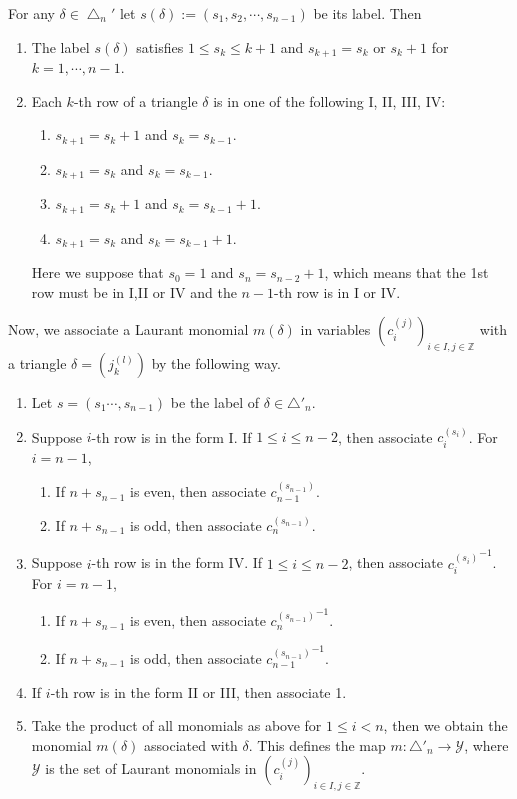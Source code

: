 \begin{lem}\label{s4-d}
For any ${\delta}\in{\bigtriangleup}_n'$ 
let $s({\delta}):=(s_1,s_2,{\cdots},s_{n-1})$ be its label.
Then 
\begin{enumerate}
\item
The label $s({\delta})$  satisfies 
$1\leq s_k\leq k+1$ and $s_{k+1}=s_k$ or $s_k+1$ for $k=1,{\cdots},n-1$.
\item
Each  $k$-th row of a triangle ${\delta}$ is in 
one of the following
     {\rm I, II, III, IV:}
\begin{enumerate}[\rm I.]
\item $s_{k+1}=s_k+1$ and $s_k=s_{k-1}$.
\item $s_{k+1}=s_k$ and $s_k=s_{k-1}$.
\item $s_{k+1}=s_k+1$ and $s_k=s_{k-1}+1$.
\item $s_{k+1}=s_k$ and $s_k=s_{k-1}+1$.
\end{enumerate}
Here we suppose that $s_0=1$ and $s_{n}=s_{n-2}+1$, which means that 
the 1st row must be in {\rm I,II or IV} 
and the $n-1$-th row is in {\rm I or IV}.
\end{enumerate}
\end{lem}
Now, we associate a Laurant 
monomial $m({\delta})$ in variables $({c_{i}^{(j)}})_{i\in I,j\in{\mathbb Z}}$ 
with a triangle ${\delta}=({j_{k}^{(l)}})$ by the
following way.
\begin{enumerate}
\item Let $s=(s_1{\cdots},s_{n-1})$  be the label of ${\delta}\in{\bigtriangleup}'_n$.
\item Suppose  $i$-th row is in the form I. If $1\leq i\leq n-2$, 
 then associate ${c_{i}^{(s_i)}}$. For $i=n-1$, 
\begin{enumerate}
\item If $n+ s_{n-1}$ is even, then associate ${c_{n-1}^{(s_{n-1})}}$.
\item If $n+ s_{n-1}$ is odd, then associate ${c_{n}^{(s_{n-1})}}$.
\end{enumerate}
\item Suppose  $i$-th row is in the form IV. If $1\leq i\leq n-2$, 
 then associate ${{c_{i}^{(s_i)}}}^{-1}$. For $i=n-1$, 
\begin{enumerate}
\item If $n+ s_{n-1}$ is even, then associate ${{c_{n}^{(s_{n-1})}}}^{-1}$.
\item If $n+ s_{n-1}$ is odd, then associate ${{c_{n-1}^{(s_{n-1})}}}^{-1}$.
\end{enumerate}
\item If  $i$-th row is in the form II or III, then associate 1.
\item  Take the product of all monomials as above for 
$1\leq i <n$, then
we obtain the monomial $m({\delta})$ associated with ${\delta}$. 
This defines the map 
$m:{\bigtriangleup}'_n\to {{\mathcal Y}}$, where ${{\mathcal Y}}$ is the set of Laurant monomials 
in $({c_{i}^{(j)}})_{i\in I,j\in{\mathbb Z}}$.
\end{enumerate}
